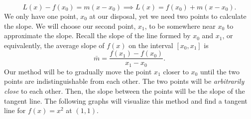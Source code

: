         \begin{equation*}
            L(x)-f(x_0)=m(x-x_0)\implies L(x)=f(x_0)+m(x-x_0).
        \end{equation*}
        We only have one point, \(x_0\) at our disposal, yet we need two points to calculate the slope. We will choose our second point, \(x_1\), to be somewhere near \(x_0\) to approximate the slope. Recall the slope of the line formed by \(x_0\) and \(x_1\), or equivalently, the average slope of \(f(x)\) on the interval \([x_0,x_1]\) is
        \begin{equation*}
            \bar{m}=\frac{f(x_1)-f(x_0)}{x_1-x_0}.
        \end{equation*}
        Our method will be to gradually move the point \(x_1\) closer to \(x_0\) until the two points are indistinguishable from each other. The two points will be \textit{arbitrarily close} to each other. Then, the slope between the points will be the slope of the tangent line. The following graphs will visualize this method and find a tangent line for \(f(x)=x^2\) at \((1,1)\).
